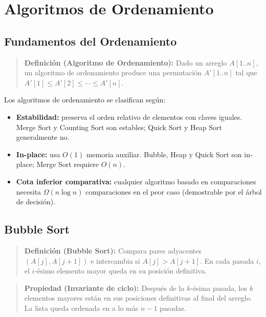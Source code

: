 \documentclass[12pt, letterpaper]{article}
\begin{document}
	\newpage
	\tableofcontents
	\newpage
	
	\section{Algoritmos de Ordenamiento}
	
	\subsection{Fundamentos del Ordenamiento}
	
	\begin{quote}
		\textbf{Definición (Algoritmo de Ordenamiento):}
		Dado un arreglo $A[1..n]$, un algoritmo de ordenamiento produce una permutación $A'[1..n]$ tal que $A'[1] \leq A'[2] \leq \cdots \leq A'[n]$.
	\end{quote}
	
	Los algoritmos de ordenamiento se clasifican según:
	
	\begin{itemize}[noitemsep]
		\item \textbf{Estabilidad:} preserva el orden relativo de elementos con claves iguales. Merge Sort y Counting Sort son estables; Quick Sort y Heap Sort generalmente no.
		\item \textbf{In-place:} usa $O(1)$ memoria auxiliar. Bubble, Heap y Quick Sort son in-place; Merge Sort requiere $O(n)$.
		\item \textbf{Cota inferior comparativa:} cualquier algoritmo basado en comparaciones necesita $\Omega(n \log n)$ comparaciones en el peor caso (demostrable por el árbol de decisión).
	\end{itemize}
	
	\subsection{Bubble Sort}
	
	\begin{quote}
		\textbf{Definición (Bubble Sort):}
		Compara pares adyacentes $(A[j], A[j+1])$ e intercambia si $A[j] > A[j+1]$. En cada pasada $i$, el $i$-ésimo elemento mayor queda en su posición definitiva.
	\end{quote}
	
	\begin{quote}
		\textbf{Propiedad (Invariante de ciclo):}
		Después de la $k$-ésima pasada, los $k$ elementos mayores están en sus posiciones definitivas al final del arreglo. La lista queda ordenada en a lo más $n-1$ pasadas.
	\end{quote}
	
\end{document}
